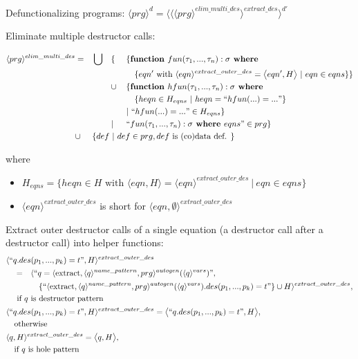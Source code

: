 \documentclass[11pt]{article} %
\begin{document}
Defunctionalizing programs: $\langle prg \rangle^d = \langle \langle \langle prg \rangle^{elim\_multi\_des} \rangle^{extract\_des} \rangle^{d'}$

Eliminate multiple destructor calls:

\begin{alignat*}{4}
\langle prg \rangle^{elim\_multi\_des} & = &&\bigcup &&\{ ~&&\{ \textrm{\textbf{function }} fun(\tau_1, ..., \tau_n): \sigma \textrm{\textbf{ where }} \\
& && && &&\quad \{ eqn' \textrm{ with } \langle eqn \rangle^{extract\_outer\_des} = \big\langle eqn', H \big\rangle ~ | ~ eqn \in eqns \} \} \\
& && && \cup && \{ \textrm{\textbf{function }} hfun(\tau_1, ..., \tau_n): \sigma \textrm{\textbf{ where }} \\
& && && &&\quad \{ heqn \in H_{eqns} ~ | ~ heqn = `` hfun(...) = ... " \} \\
& && && && | ~  `` hfun(...) = ... " \in H_{eqns} \} \\
& && && | && `` fun (\tau_1, ..., \tau_n): \sigma \textrm{\textbf{ where }} eqns " \in prg \} \\
& \cup && \{ def ~ | ~ def \in prg, def \textrm{ is (co)data def. } \} \span\span\span\span
\end{alignat*}

where
\begin{itemize}
\item $H_{eqns} = \{ heqn \in H \textrm{ with } \big\langle eqn, H \big\rangle = \langle eqn \rangle^{extract\_outer\_des} ~ | ~ eqn \in eqns \}$

\item $\langle eqn \rangle^{extract\_outer\_des}$ is short for $\langle eqn, \emptyset \rangle^{extract\_outer\_des}$
\end{itemize}

Extract outer destructor calls of a single equation (a destructor call after a destructor call) into helper functions:
\begin{alignat*}{2}
& \langle `` q.des(p_1, ..., p_k) = t ", H \rangle^{extract\_outer\_des} \span\span \\
&\quad = &&\langle `` q = \langle \textrm{extract}, \langle q \rangle^{name\_pattern}, prg \rangle^{autogen}(\langle q \rangle^{vars})  ", \\
& &&\quad \{`` \langle \textrm{extract}, \langle q \rangle^{name\_pattern}, prg \rangle^{autogen}(\langle q \rangle^{vars}).des(p_1, ..., p_k) = t  "\} \cup H \rangle^{extract\_outer\_des}, \\
&\quad \textrm{ if $q$ is destructor pattern } \span\span \\
& \langle `` q.des(p_1, ..., p_k) = t ", H \rangle^{extract\_outer\_des} = \big\langle `` q.des(p_1, ..., p_k) = t ", H \big\rangle, \span\span \\
&\quad \textrm{otherwise} \span\span \\
& \langle q, H \rangle^{extract\_outer\_des} = \big\langle q, H \big\rangle, \span\span \\
&\quad \textrm{if $q$ is hole pattern} \span\span
\end{alignat*}
\end{document}
